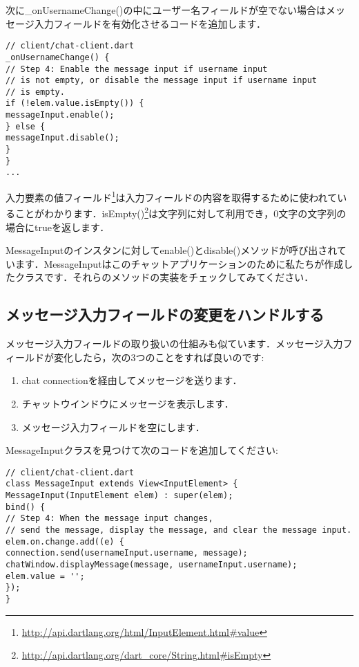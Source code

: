 次に\_onUsernameChange()の中にユーザー名フィールドが空でない場合はメッセージ入力フィールドを有効化させるコードを追加します．

\begin{verbatim}
// client/chat-client.dart
_onUsernameChange() {
// Step 4: Enable the message input if username input
// is not empty, or disable the message input if username input
// is empty.
if (!elem.value.isEmpty()) {
messageInput.enable();
} else {
messageInput.disable();
}
}
...
\end{verbatim}

入力要素の値フィールド\footnote{\url{http://api.dartlang.org/html/InputElement.html#value}}は入力フィールドの内容を取得するために使われていることがわかります．isEmpty()\footnote{\url{http://api.dartlang.org/dart_core/String.html#isEmpty}}は文字列に対して利用でき，0文字の文字列の場合にtrueを返します．

MessageInputのインスタンに対してenable()とdisable()メソッドが呼び出されています．MessageInputはこのチャットアプリケーションのために私たちが作成したクラスです．それらのメソッドの実装をチェックしてみてください．

\subsection{メッセージ入力フィールドの変更をハンドルする}

メッセージ入力フィールドの取り扱いの仕組みも似ています．メッセージ入力フィールドが変化したら，次の3つのことをすれば良いのです:

\begin{enumerate}
\item chat connectionを経由してメッセージを送ります．
\item チャットウインドウにメッセージを表示します．
\item メッセージ入力フィールドを空にします．
\end{enumerate}

MessageInputクラスを見つけて次のコードを追加してください:

\begin{verbatim}
// client/chat-client.dart
class MessageInput extends View<InputElement> {
MessageInput(InputElement elem) : super(elem);
bind() {
// Step 4: When the message input changes,
// send the message, display the message, and clear the message input.
elem.on.change.add((e) {
connection.send(usernameInput.username, message);
chatWindow.displayMessage(message, usernameInput.username);
elem.value = '';
});
}
\end{verbatim}


